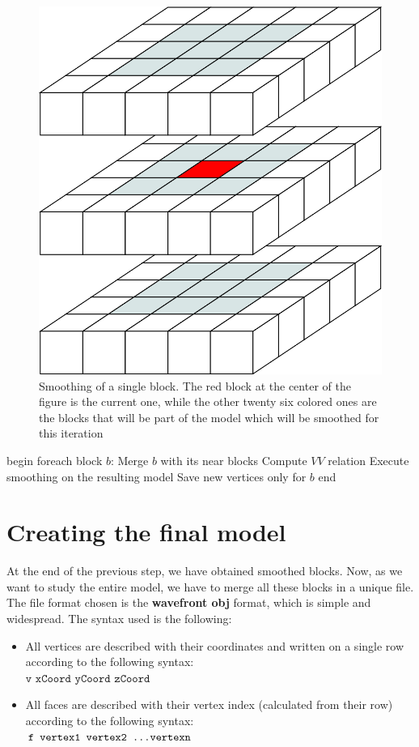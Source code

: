 \begin{figure}[htb] %
   \centering
   \includegraphics[width=0.30\linewidth]{images/SmoothingBlocks.png}
   \caption[Smoothing of a single block]{Smoothing of a single block. The red block at the center of the figure is the current one, while the other twenty six colored ones are the blocks that will be part of the model which will be smoothed for this iteration}
   \label{fig:SmoothingBlocks}
\end{figure}

\begin{pseudo}[caption={Smoothing of a block}, label={lst:blockSmoothing}]
begin
  foreach block $b$:
    Merge $b$ with its near blocks
    Compute $VV$ relation
    Execute smoothing on the resulting model
    Save new vertices only for $b$
end
\end{pseudo}

\section{Creating the final model}\label{sec33:FinalModel}

At the end of the previous step, we have obtained smoothed blocks. Now, as we want to study the entire model, we have to merge all these blocks in a unique file. The file format chosen is the \textbf{wavefront obj} format, which is simple and widespread. The syntax used is the following:

\begin{itemize}
 \item All vertices are described with their coordinates and written on a single row according to the following syntax:\\ $\texttt{v xCoord yCoord zCoord}$
 \item All faces are described with their vertex index (calculated from their row) according to the following syntax:\\ $\texttt{f vertex1 vertex2 \dots vertexn}$
\end{itemize}

